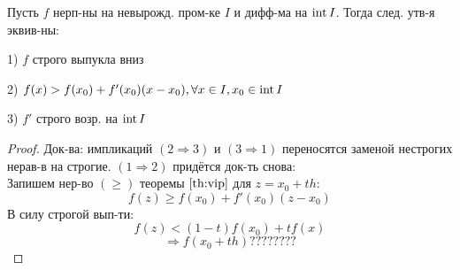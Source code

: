 \begin{theorem}
Пусть $f$ нерп-ны на невырожд. пром-ке $I$ и дифф-ма на $\operatorname{int} I$. Тогда след. утв-я эквив-ны:
  \item [1) ]$f$ строго выпукла вниз 
  \item [2) ]$f(x) > f(x_0) + f'(x_0)(x - x_0), \forall x \in I, x_0 \in \operatorname{int} I$
  \item [3) ] $f'$ строго возр. на $\operatorname{int} I$
\end{theorem}
\begin{proof}
Док-ва: импликаций $(2 \Rightarrow 3)$ и $(3 \Rightarrow 1)$ переносятся заменой нестрогих нерав-в на строгие. $(1 \Rightarrow 2)$ придётся док-ть снова: \\
Запишем нер-во $(\geq)$ теоремы $\ref{th:vip}$ для $z = x_0 + t h$:
\[
f(z) \geq f(x_0) + f'(x_0) (z - x_0)
\]
В силу строгой вып-ти:
\[
f(z) < (1 - t)f(x_0) + tf(x)
\]
\[
\Rightarrow f(x_0 + t h) ????????
\]
\end{proof}
